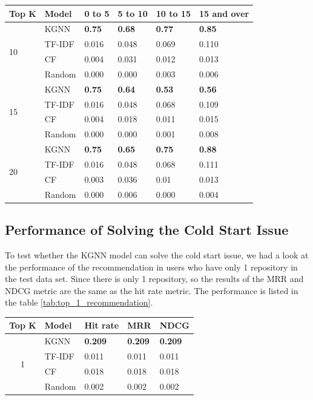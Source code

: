 \documentclass[11pt,twoside]{report}
\begin{document}
\begin{center}
    \begin{tabular}{l | l | l | l | l | l}
    \hline
    Top K & Model & 0 to 5 & 5 to 10 & 10 to 15 & 15 and over \\
    \hline
    \multirow{4}{*}{10} 
    & KGNN & \textbf{0.75} & \textbf{0.68} & \textbf{0.77} & \textbf{0.85} \\
    & TF-IDF & 0.016 & 0.048 & 0.069 & 0.110 \\
    & CF & 0.004 & 0.031 & 0.012 & 0.013 \\
    & Random & 0.000 & 0.000 & 0.003 & 0.006 \\
    \hline
    \multirow{4}{*}{15}
    & KGNN & \textbf{0.75} & \textbf{0.64} & \textbf{0.53} & \textbf{0.56} \\
    & TF-IDF & 0.016 & 0.048 & 0.068 & 0.109 \\
    & CF & 0.004 & 0.018 & 0.011 & 0.015 \\
    & Random & 0.000 & 0.000 & 0.001 & 0.008 \\
    \hline
    \multirow{4}{*}{20}
    & KGNN & \textbf{0.75} & \textbf{0.65} & \textbf{0.75} & \textbf{0.88} \\
    & TF-IDF & 0.016 & 0.048 & 0.068 & 0.111 \\
    & CF & 0.003 & 0.036 & 0.01 & 0.013 \\
    & Random & 0.000 & 0.006 & 0.000 & 0.004 \\
    \end{tabular}
    \label{tab:ndcg_group_performance}
\end{center}

\subsection{Performance of Solving the Cold Start Issue}
To test whether the KGNN model can solve the cold start issue, we had a look at the performance of the recommendation in users who have only 1 repository in the test data set. Since there is only 1 repository, so the results of the MRR and NDCG metric are the same as the hit rate metric. The performance is listed in the table \ref{tab:top_1_recommendation}.

\begin{center}
    \begin{tabular}{c | l | l | l | l}
    \hline
    Top K & Model & Hit rate & MRR & NDCG\\
    \hline
    \multirow{4}{*}{1} 
    & KGNN & \textbf{0.209} & \textbf{0.209} & \textbf{0.209} \\
    & TF-IDF & 0.011 & 0.011 & 0.011 \\
    & CF & 0.018 & 0.018 & 0.018 \\
    & Random & 0.002 & 0.002 & 0.002 \\
    \end{tabular}
    \label{tab:top_1_recommendation}
\end{center}
\end{document}
